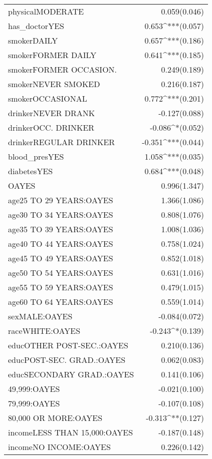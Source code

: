 \begin{longtable}{@{\extracolsep{5pt}}lD{.}{.}{-3} }
  physicalMODERATE & 0.059$ $(0.046) \\ 
  has\_doctorYES & 0.653^{***}$ $(0.057) \\ 
  smokerDAILY & 0.657^{***}$ $(0.186) \\ 
  smokerFORMER DAILY & 0.641^{***}$ $(0.185) \\ 
  smokerFORMER OCCASION. & 0.249$ $(0.189) \\ 
  smokerNEVER SMOKED & 0.216$ $(0.187) \\ 
  smokerOCCASIONAL & 0.772^{***}$ $(0.201) \\ 
  drinkerNEVER DRANK & -0.127$ $(0.088) \\ 
  drinkerOCC. DRINKER & -0.086^{*}$ $(0.052) \\ 
  drinkerREGULAR DRINKER & -0.351^{***}$ $(0.044) \\ 
  blood\_presYES & 1.058^{***}$ $(0.035) \\ 
  diabetesYES & 0.684^{***}$ $(0.048) \\ 
  OAYES & 0.996$ $(1.347) \\ 
  age25 TO 29 YEARS:OAYES & 1.366$ $(1.086) \\ 
  age30 TO 34 YEARS:OAYES & 0.808$ $(1.076) \\ 
  age35 TO 39 YEARS:OAYES & 1.008$ $(1.036) \\ 
  age40 TO 44 YEARS:OAYES & 0.758$ $(1.024) \\ 
  age45 TO 49 YEARS:OAYES & 0.852$ $(1.018) \\ 
  age50 TO 54 YEARS:OAYES & 0.631$ $(1.016) \\ 
  age55 TO 59 YEARS:OAYES & 0.479$ $(1.015) \\ 
  age60 TO 64 YEARS:OAYES & 0.559$ $(1.014) \\ 
  sexMALE:OAYES & -0.084$ $(0.072) \\ 
  raceWHITE:OAYES & -0.243^{*}$ $(0.139) \\ 
  educOTHER POST-SEC.:OAYES & 0.210$ $(0.136) \\ 
  educPOST-SEC. GRAD.:OAYES & 0.062$ $(0.083) \\ 
  educSECONDARY GRAD.:OAYES & 0.141$ $(0.106) \\ 
  49,999:OAYES & -0.021$ $(0.100) \\ 
  79,999:OAYES & -0.107$ $(0.108) \\ 
  80,000 OR MORE:OAYES & -0.313^{**}$ $(0.127) \\ 
  incomeLESS THAN 15,000:OAYES & -0.187$ $(0.148) \\ 
  incomeNO INCOME:OAYES & 0.226$ $(0.142) \\ 

\end{longtable}
